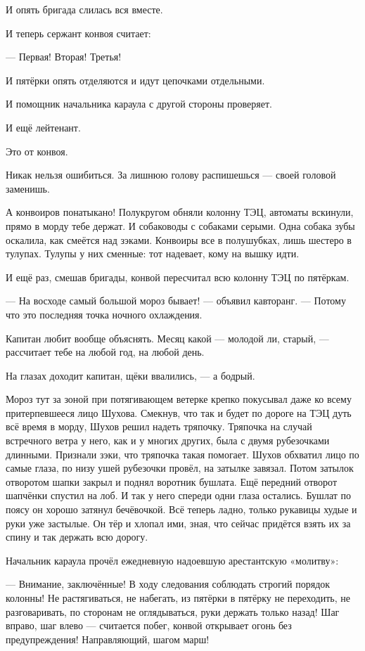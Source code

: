 И опять бригада слилась вся вместе.

И теперь сержант конвоя считает:

--- Первая! Вторая! Третья!

И пятёрки опять отделяются и идут цепочками отдельными.

И помощник начальника караула с другой стороны проверяет.

И ещё лейтенант.

Это от конвоя.

Никак нельзя ошибиться. За лишнюю голову распишешься --- своей головой заменишь.

А конвоиров понатыкано! Полукругом обняли колонну ТЭЦ, автоматы вскинули, прямо в морду тебе
держат. И собаководы с собаками серыми. Одна собака зубы оскалила, как смеётся над зэками.
Конвоиры все в полушубках, лишь шестеро в тулупах. Тулупы у них сменные: тот надевает, кому на
вышку идти.

И ещё раз, смешав бригады, конвой пересчитал всю колонну ТЭЦ по пятёркам.

--- На восходе самый большой мороз бывает! --- объявил кавторанг. --- Потому что это последняя
точка ночного охлаждения.

Капитан любит вообще объяснять. Месяц какой --- молодой ли, старый, --- рассчитает тебе на любой
год, на любой день.

На глазах доходит капитан, щёки ввалились, --- а бодрый.

Мороз тут за зоной при потягивающем ветерке крепко покусывал даже ко всему притерпевшееся
лицо Шухова. Смекнув, что так и будет по дороге на ТЭЦ дуть всё время в морду, Шухов решил
надеть тряпочку. Тряпочка на случай встречного ветра у него, как и у многих других, была с
двумя рубезочками длинными. Признали зэки, что тряпочка такая помогает. Шухов обхватил лицо
по самые глаза, по низу ушей рубезочки провёл, на затылке завязал. Потом затылок отворотом
шапки закрыл и поднял воротник бушлата. Ещё передний отворот шапчёнки спустил на лоб. И так у
него спереди одни глаза остались. Бушлат по поясу он хорошо затянул бечёвочкой. Всё теперь
ладно, только рукавицы худые и руки уже застылые. Он тёр и хлопал ими, зная, что сейчас
придётся взять их за спину и так держать всю дорогу.

Начальник караула прочёл ежедневную надоевшую арестантскую «молитву»:

--- Внимание, заключённые! В ходу следования соблюдать строгий порядок колонны! Не
растягиваться, не набегать, из пятёрки в пятёрку не переходить, не разговаривать, по
сторонам не оглядываться, руки держать только назад! Шаг вправо, шаг влево --- считается
побег, конвой открывает огонь без предупреждения! Направляющий, шагом марш!

